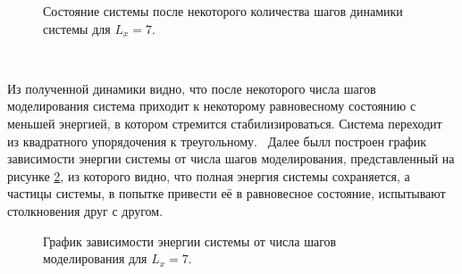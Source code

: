 \documentclass[14pt,a4paper,report]{ncc}
\begin{document}
\begin{figure}[h]
\caption{Состояние системы после некоторого количества шагов динамики системы для $L_x=7$.}
\label{ris:image7}
\end{figure}
\

Из полученной динамики видно, что после некоторого числа шагов моделирования система приходит к некоторому равновесному состоянию с меньшей энергией, в котором стремится стабилизироваться. Система переходит из квадратного упорядочения к треугольному.
\
Далее былл построен график зависимости энергии системы от числа шагов моделирования, представленный на рисунке \ref{ris:image8}, из которого видно, что полная энергия системы сохраняется, а частицы системы, в попытке привести её в равновесное состояние, испытывают столкновения друг с другом.
\

\begin{figure}[t!]
\caption{График зависимости энергии системы от числа шагов моделирования для $L_x=7$.}
\label{ris:image8}
\end{figure}
\
\end{document}
